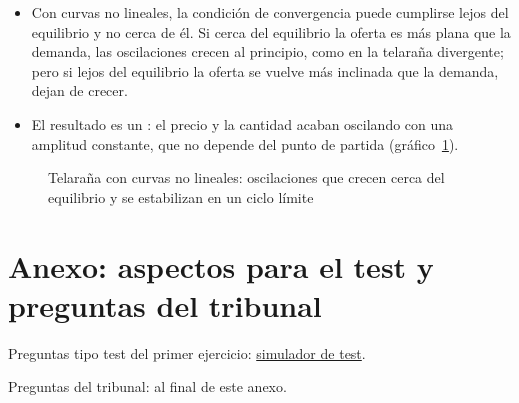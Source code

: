 \documentclass[11pt]{article}
\begin{document}
\begin{itemize}
\item Con curvas no lineales, la condición de convergencia puede cumplirse lejos del equilibrio y no cerca de él. Si cerca del equilibrio la oferta es más plana que la demanda, las oscilaciones crecen al principio, como en la telaraña divergente; pero si lejos del equilibrio la oferta se vuelve más inclinada que la demanda, dejan de crecer.
\item El resultado es un : el precio y la cantidad acaban oscilando con una amplitud constante, que no depende del punto de partida (gráfico~\ref{fig:telarana-ciclo-limite}).
\end{itemize}

\begin{figure}[H]
\centering
\caption{Telaraña con curvas no lineales: oscilaciones que crecen cerca del equilibrio y se estabilizan en un ciclo límite}\label{fig:telarana-ciclo-limite}
\end{figure}

\section{Anexo: aspectos para el test y preguntas del tribunal}\label{anexo:test}

\begin{anotaciones}
Preguntas tipo test del primer ejercicio: \href{https://www.victorgutierrezmarcos.es/oposicion/temario/primer-ejercicio/test/simulador.html?tema=3.A.16}{simulador de test}.

Preguntas del tribunal: al final de este anexo.
\end{anotaciones}
\end{document}
